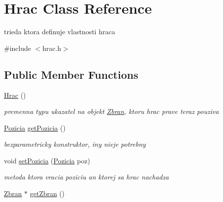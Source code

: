 \hypertarget{class_hrac}{\section{Hrac Class Reference}
\label{class_hrac}
}


trieda ktora definuje vlastnosti hraca  




{\ttfamily \#include $<$hrac.\-h$>$}

\subsection*{Public Member Functions}
\begin{DoxyCompactItemize}
\item 
\hypertarget{class_hrac_a47fe983c204445b3f1c638c5ef799df4}{\hyperlink{class_hrac_a47fe983c204445b3f1c638c5ef799df4}{Hrac} ()}\label{class_hrac_a47fe983c204445b3f1c638c5ef799df4}

\begin{DoxyCompactList}\small\item\em premenna typu ukazatel na objekt \hyperlink{class_zbran}{Zbran}, ktoru hrac prave teraz pouziva \end{DoxyCompactList}\item 
\hypertarget{class_hrac_a6ea5accaf15f5712076c8dcc6c1b09d1}{\hyperlink{struct_pozicia}{Pozicia} \hyperlink{class_hrac_a6ea5accaf15f5712076c8dcc6c1b09d1}{get\-Pozicia} ()}\label{class_hrac_a6ea5accaf15f5712076c8dcc6c1b09d1}

\begin{DoxyCompactList}\small\item\em bezparametricky konstruktor, iny nieje potrebny \end{DoxyCompactList}\item 
\hypertarget{class_hrac_a6c9c09d4dafa26517536e914f7d57fd6}{void \hyperlink{class_hrac_a6c9c09d4dafa26517536e914f7d57fd6}{set\-Pozicia} (\hyperlink{struct_pozicia}{Pozicia} poz)}\label{class_hrac_a6c9c09d4dafa26517536e914f7d57fd6}

\begin{DoxyCompactList}\small\item\em metoda ktora vracia poziciu an ktorej sa hrac nachadza \end{DoxyCompactList}\item 
\hypertarget{class_hrac_afc0949f3d26024f6315f5bb054c1346f}{\hyperlink{class_zbran}{Zbran} $\ast$ \hyperlink{class_hrac_afc0949f3d26024f6315f5bb054c1346f}{get\-Zbran} ()}\label{class_hrac_afc0949f3d26024f6315f5bb054c1346f}


\end{DoxyCompactItemize}
